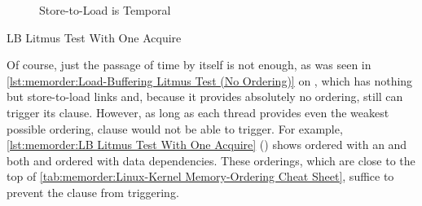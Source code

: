 \begin{figure}
\centering
{}
\caption{Store-to-Load is Temporal}
\label{fig:memorder:Store-to-Load is Temporal}
\end{figure}

\begin{listing}

\caption{LB Litmus Test With One Acquire}
\label{lst:memorder:LB Litmus Test With One Acquire}
\end{listing}

Of course, just the passage of time by itself is not enough, as
was seen in
\cref{lst:memorder:Load-Buffering Litmus Test (No Ordering)}
on
,
which has nothing but store-to-load links and, because it provides
absolutely no ordering, still can trigger its  clause.
However, as long as each thread provides even the weakest possible
ordering,  clause would not be able to trigger.
For example,
\cref{lst:memorder:LB Litmus Test With One Acquire}
()
shows  ordered with an  and
both  and  ordered with data dependencies.
These orderings, which are close to the top of
\cref{tab:memorder:Linux-Kernel Memory-Ordering Cheat Sheet},
suffice to prevent the  clause from triggering.

\QuickQuizEnd

